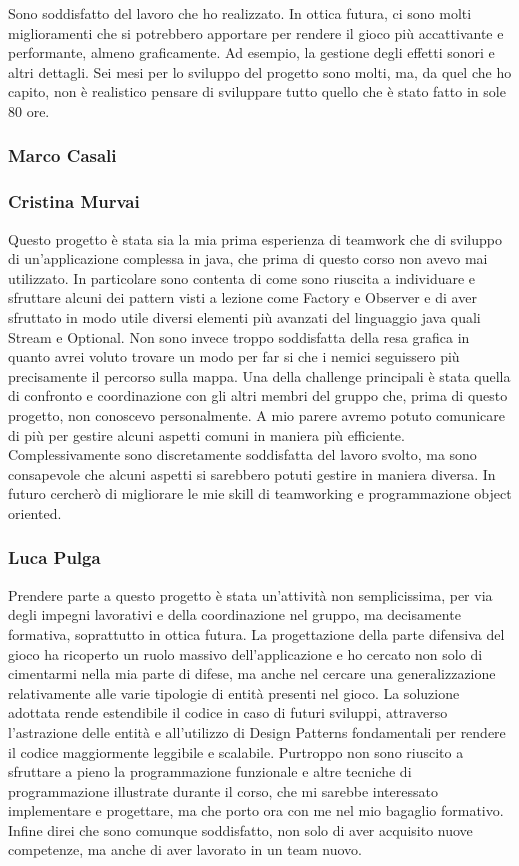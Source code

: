 \documentclass[a4paper,12pt]{report}
\begin{document}
Sono soddisfatto del lavoro che ho realizzato. In ottica futura, ci sono molti miglioramenti che si potrebbero apportare per rendere il gioco più accattivante e performante, almeno graficamente. Ad esempio, la gestione degli effetti sonori e altri dettagli. Sei mesi per lo sviluppo del progetto sono molti, ma, da quel che ho capito, non è realistico pensare di sviluppare tutto quello che è stato fatto in sole 80 ore.
\subsubsection{Marco Casali}
\subsubsection{Cristina Murvai}
Questo progetto è stata sia la mia prima esperienza di teamwork che di sviluppo di un'applicazione complessa in java, che prima di questo corso non avevo mai utilizzato. In particolare sono contenta di come sono riuscita a individuare e sfruttare alcuni dei pattern visti a lezione come Factory e Observer e di aver sfruttato in modo utile diversi elementi più avanzati del linguaggio java quali Stream e Optional.
Non sono invece troppo soddisfatta della resa grafica in quanto avrei voluto trovare un modo per far si che i nemici seguissero più precisamente il percorso sulla mappa.
Una della challenge principali è stata quella di confronto e coordinazione con gli altri membri del gruppo che, prima di questo progetto, non conoscevo personalmente. A mio parere avremo potuto comunicare di più per gestire alcuni aspetti comuni in maniera più efficiente.
Complessivamente sono discretamente soddisfatta del lavoro svolto, ma sono consapevole che alcuni aspetti si sarebbero potuti gestire in maniera diversa. In futuro cercherò di migliorare le mie skill di teamworking e programmazione object oriented. 


\subsubsection{Luca Pulga}
Prendere parte a questo progetto è stata un'attività non semplicissima, per via degli impegni lavorativi e della coordinazione nel gruppo, ma decisamente formativa, soprattutto in ottica futura.
La progettazione della parte difensiva del gioco ha ricoperto un ruolo massivo dell'applicazione e ho cercato non solo di cimentarmi nella mia parte di difese, ma anche nel cercare una generalizzazione relativamente alle varie tipologie di entità presenti nel gioco. 
La soluzione adottata rende estendibile il codice in caso di futuri sviluppi, attraverso l'astrazione delle entità e all'utilizzo di Design Patterns fondamentali per rendere il codice maggiormente leggibile e scalabile. 
Purtroppo non sono riuscito a sfruttare a pieno la programmazione funzionale e altre tecniche di programmazione illustrate durante il corso, che mi sarebbe interessato implementare e progettare, ma che porto ora con me nel mio bagaglio formativo. 
Infine direi che sono comunque soddisfatto, non solo di aver acquisito nuove competenze, ma anche di aver lavorato in un team nuovo.
\end{document}
